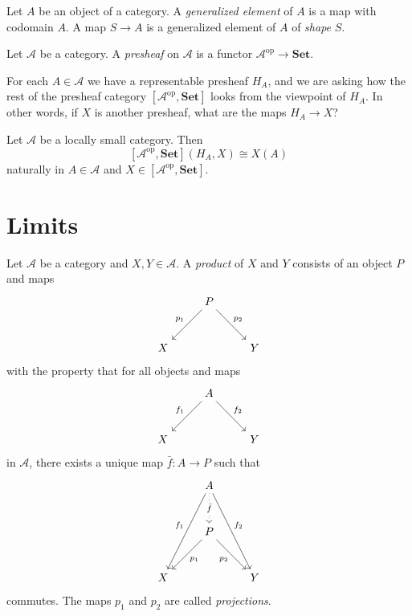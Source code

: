 \begin{definition}
  Let $A$ be an object of a category. A \textit{generalized element} of $A$ is a map with codomain $A$. A map $S\to A$ is a generalized element of $A$ of  \textit{shape} $S$.
\end{definition}

\begin{definition}
  Let $\mathscr{A}$ be a category. A \textit{presheaf} on $\mathscr{A}$ is a functor $\mathscr{A}^{\mathrm{op}}\to \mathbf{Set}$.
\end{definition}

For each $A\in \mathscr{A}$ we have a representable presheaf $H_A$, and we are asking how the rest of the presheaf category $\left[ \mathscr{A}^{\mathrm{op}},\mathbf{Set} \right] $ looks from the viewpoint of $H_A$. In other words, if $X$ is another presheaf, what are the maps $H_A\to X$?

\begin{theorem}[Yoneda]
  Let $\mathscr{A}$ be a locally small category. Then
  \begin{equation}
    \left[ \mathscr{A}^{\mathrm{op}},\mathbf{Set} \right] (H_A,X)\cong X(A)
  \end{equation}
  naturally in $A\in \mathscr{A}$ and $X \in \left[ \mathscr{A}^{\mathrm{op}},\mathbf{Set} \right] $.
\end{theorem}


\section{Limits}

\begin{definition}
  Let $\mathscr{A}$ be a category and $X,Y\in \mathscr{A}$. A \textit{product} of $X$ and $Y$ consists of an object $P$ and maps
  \[
    \begin{tikzcd}[row sep =large]
    & P \arrow[ld, "p_1"'] \arrow[rd,"p_2"] &\\
    X & & Y
  \end{tikzcd}
  \] 
  with the property that for all objects and maps
  \begin{equation}
    \begin{tikzcd}[row sep=large]
      &A \arrow[ld, "f_1"'] \arrow[rd,"f_2"] &\\
      X&&Y
    \end{tikzcd}
  \end{equation}
  in $\mathscr{A}$, there exists a unique map $\bar{f}:A\to P$ such that 
  \begin{equation}
    \begin{tikzcd}[row sep=large]
      &A \arrow[ldd,"f_1"'] \arrow[rdd,"f_2"] \arrow[d,dotted ,"\bar{f}" description] &\\
      &P\arrow[ld,"p_1"] \arrow[rd,"p_2"'] &\\
      X & & Y
    \end{tikzcd}
  \end{equation}
  commutes. The maps $p_1$ and $p_2$ are called \textit{projections}.
\end{definition}



